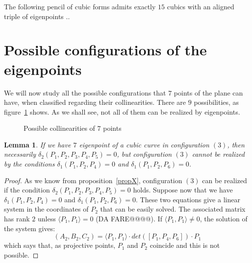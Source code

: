 \documentclass{amsart}
\theoremstyle{plain}
\newtheorem{lemma}[theorem]{Lemma}
\theoremstyle{definition}
\newcommand{\scl}[2]{\langle #1, #2 \rangle}
\begin{document}
The following pencil of cubic forms admits exactly $15$ cubics with an aligned triple of eigenpoints ..









\section{Possible configurations of the eigenpoints}

We will now study all the possible configurations that $7$ points of the
plane can have, when classified regarding their collinearities. There are
$9$ possibilities, as figure~\ref{collin} shows. As we shall see,
not all of them can be realized by eigenpoints. 

\begin{figure}
\caption{Possible collinearities of $7$ points
\label{collin}}
\end{figure}


\begin{lemma} If we have $7$ eigenpoint of a cubic curve in configuration
  $(3)$, then necessarily $\delta_2(P_1, P_2, P_3, P_4, P_5)=0$, but
  configuration $(3)$ cannot be realized by the conditions
  $\delta_1(P_1, P_2, P_4) = 0$ and
  $\delta_1(P_1, P_2, P_6)=0$.
\end{lemma}
\begin{proof}
As we know from proposition~\ref{propX}, configuration $(3)$ can be realized
if the condition $\delta_2(P_1, P_2, P_3, P_4, P_5) = 0$ holds.
Suppose now that we have
$\delta_1(P_1, P_2, P_4) = 0$ and  $\delta_1(P_1, P_2, P_6)=0$. These
two equations give a linear system in the coordinates of $P_2$ that can
be easily solved. The associated matrix has rank $2$ unless
$\scl{P_1}{P_1}=0$ (DA FARE@@@@). If $\scl{P_1}{P_1} \not = 0$,
the solution of the system gives:
\[
(A_2, B_2, C_2) = \scl{P_1}{P_1} \cdot det([P_1, P_4, P_6])\cdot P_1
\]
which says that, as projective points, $P_1$ and $P_2$ coincide and this is
not possible. 
\end{proof}
\end{document}

